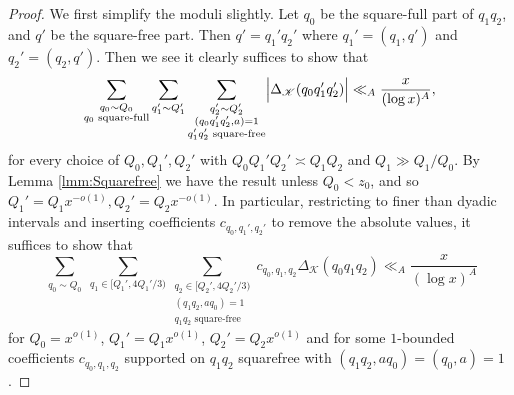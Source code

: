 \documentclass[10pt]{amsart}
\theoremstyle{plain}
\numberwithin{equation}{section}
\begin{document}
\begin{proof}
We first simplify the moduli slightly. Let $q_0$ be the square-full part of $q_1q_2$, and $q'$ be the square-free part. Then $q'=q_1'q_2'$ where $q_1'=(q_1,q')$ and $q_2'=(q_2,q')$. Then we see it clearly suffices to show that
\[
\sum_{\substack{q_0\sim Q_0\\ q_0\text{ square-full}}}\sum_{q_1'\sim Q_1'}\sum_{\substack{q_2'\sim Q_2'\\ (q_0q_1'q_2',a)=1\\ q_1'q_2' \text{ square-free}}}\Bigl|\Delta_{\mathscr{K}}(q_0q_1'q_2')\Bigr|\ll_A\frac{x}{(\log{x})^{A}},
\]
for every choice of $Q_0,Q_1',Q_2'$ with $Q_0Q_1'Q_2'\asymp Q_1Q_2$ and $Q_1\gg Q_1/Q_0$. By Lemma \ref{lmm:Squarefree} we have the result unless $Q_0<z_0$, and so $Q_1'=Q_1 x^{-o(1)}, Q_2'=Q_2x^{-o(1)}$. In particular, restricting to finer than dyadic intervals and inserting coefficients $c_{q_0,q_1',q_2'}$ to remove the absolute values, it suffices to show that
\[
\sum_{\substack{q_0\sim Q_0}}\sum_{q_1\in[Q_1',4Q_1'/3)}\sum_{\substack{q_2\in[Q_2',4Q_2'/3)\\ (q_1q_2,a q_0)=1\\ q_1q_2\text{ square-free}}}c_{q_0,q_1,q_2}\Delta_\mathscr{K}(q_0 q_1 q_2)\ll_A \frac{x}{(\log{x})^{A}}
\]
for $Q_0=x^{o(1)}$, $Q_1'=Q_1x^{o(1)}$, $Q_2'=Q_2x^{o(1)}$ and for some $1$-bounded coefficients $c_{q_0,q_1,q_2}$ supported on $q_1q_2$ squarefree with $(q_1q_2,a q_0)=(q_0,a)=1$.


\end{proof}
\end{document}
